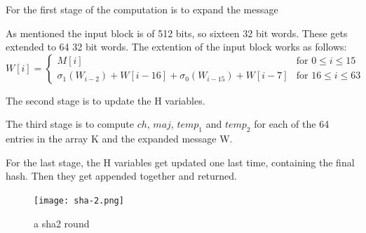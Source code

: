 \documentclass[a4paper]{article}
\begin{document}
For the first stage of the computation is to expand the message

As mentioned the input block is of 512 bits, so sixteen 32 bit words. These gets extended to 64 32 bit words.
The extention of the input block works as follows:
\begin{equation}
  W[i] =
  \begin{cases}
    M[i]  &\text{for } 0 \leq i \leq 15\\
    \sigma_1(W_{i-2}) + W[i-16] + \sigma_0(W_{i-15}) + W[i-7] &\text{for } 16 \leq i \leq 63
  \end{cases}
\end{equation}

The second stage is to update the H variables.

The third stage is to compute \(ch\), \(maj\), \(temp_1\) and \(temp_2\) for each of the 64 entries in the array K and the expanded message W.

For the last stage, the H variables get updated one last time, containing the final hash. Then they get appended together and returned.

\begin{figure}[H]
\centering
\texttt{[image: sha-2.png]}
\caption{a sha2 round}
\label{fig:sha2round}
\end{figure}
\end{document}

